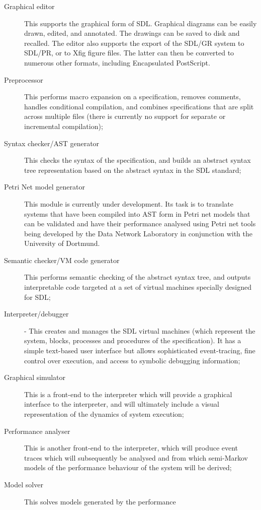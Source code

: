 \begin{description}
\item [Graphical editor] This supports the graphical form of SDL.
Graphical diagrams can be easily drawn, edited, and annotated.
The drawings can be saved to disk and recalled. The editor also
supports the export of the SDL/GR system to SDL/PR, or to Xfig
figure files. The latter can then be converted to numerous other
formats, including Encapsulated PostScript.
\item [Preprocessor] This performs macro expansion on a
specification, removes comments, handles conditional compilation,
and combines specifications that are split across multiple files 
(there is currently no support for separate or incremental
compilation);
\item [Syntax checker/AST generator] This checks the syntax of the
specification, and builds an abstract syntax tree representation
based on the abstract syntax in the SDL standard;
\item [Petri Net model generator] This module is currently under 
development. Its task is to translate systems that have been compiled
into AST form in Petri net models that can be validated and
have their performance analysed using Petri net tools being
developed by the Data Network Laboratory in conjunction with the
University of Dortmund.
\item [Semantic checker/VM code generator] This performs semantic
checking of the abstract syntax tree, and outputs interpretable code
targeted at a set of virtual machines specially designed for SDL;
\item [Interpreter/debugger] - This creates and manages the SDL
virtual machines (which represent the system, blocks, processes and
procedures of the specification). It has a simple text-based user
interface but allows sophisticated event-tracing, fine control over
execution, and access to symbolic debugging information;
\item [Graphical simulator] This is a front-end to the interpreter
which will provide a graphical interface to the interpreter,
and will ultimately include a visual representation of the dynamics of system
execution;
\item [Performance analyser] This is another front-end to the interpreter,
which will produce event traces which will subsequently be analysed and from
which semi-Markov
models of the performance behaviour of the system will be derived;
\item [Model solver] This solves models generated by the performance

\end{description}
